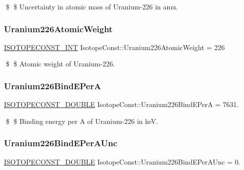 \$ \$ Uncertainty in atomic mass of Uranium-\/226 in amu. \mbox{\label{group___isotope_const-_uranium-_u226_gaffe22bf2c47f1ff420883953139e4fbe}} 
\subsubsection{\texorpdfstring{Uranium226\+Atomic\+Weight}{Uranium226AtomicWeight}}
{\footnotesize\ttfamily \mbox{\hyperlink{group___isotope_const-_macros_ga5f18360b3e99483a35c32d789e62621c}{I\+S\+O\+T\+O\+P\+E\+C\+O\+N\+S\+T\+\_\+\+I\+NT}} Isotope\+Const\+::\+Uranium226\+Atomic\+Weight = 226}

\$ \$ Atomic weight of Uranium-\/226. \mbox{\label{group___isotope_const-_uranium-_u226_gabd54a9760eb67199bc07a77e93a3fb16}} 
\subsubsection{\texorpdfstring{Uranium226\+Bind\+E\+PerA}{Uranium226BindEPerA}}
{\footnotesize\ttfamily \mbox{\hyperlink{group___isotope_const-_macros_ga8f45a7272ce02c0b4c65c44636ed719a}{I\+S\+O\+T\+O\+P\+E\+C\+O\+N\+S\+T\+\_\+\+D\+O\+U\+B\+LE}} Isotope\+Const\+::\+Uranium226\+Bind\+E\+PerA = 7631.}

\$ \$ Binding energy per A of Uranium-\/226 in keV. \mbox{\label{group___isotope_const-_uranium-_u226_ga1c6e57af3fa639e704d9f4f8c906950c}} 
\subsubsection{\texorpdfstring{Uranium226\+Bind\+E\+Per\+A\+Unc}{Uranium226BindEPerAUnc}}
{\footnotesize\ttfamily \mbox{\hyperlink{group___isotope_const-_macros_ga8f45a7272ce02c0b4c65c44636ed719a}{I\+S\+O\+T\+O\+P\+E\+C\+O\+N\+S\+T\+\_\+\+D\+O\+U\+B\+LE}} Isotope\+Const\+::\+Uranium226\+Bind\+E\+Per\+A\+Unc = 0.}

